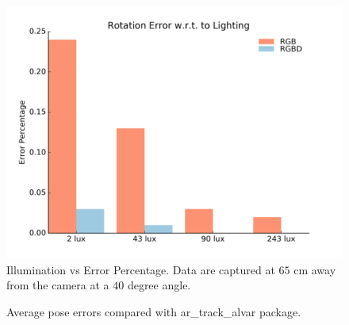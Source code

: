 \begin{figure}
\centering
\includegraphics[width=\columnwidth]{figs/lighting_fig1}
\caption{Illumination vs Error Percentage. Data are captured at $65$ cm away from the camera at a $40$ degree angle.}
\label{fig:lighting_result}
\end{figure}

\begin{figure}
\centering
{}
\caption{Average pose errors compared with ar\_track\_alvar package.}
\label{fig:alvartrack}
\end{figure}

